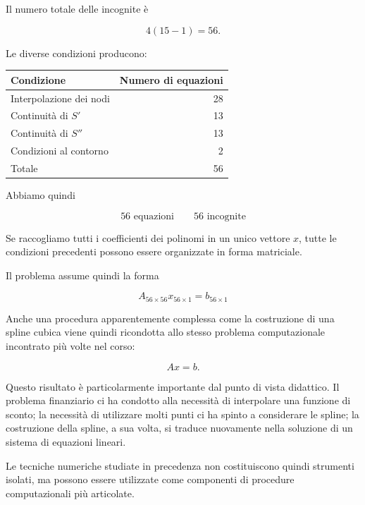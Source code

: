 Il numero totale delle incognite è

\begin{equation*}
    4(15-1)=56.
\end{equation*}

Le diverse condizioni producono:

\begin{center}
\begin{tabular}{lr}
\hline
Condizione & Numero di equazioni\\
\hline
Interpolazione dei nodi & 28\\
Continuità di $S'$ & 13\\
Continuità di $S''$ & 13\\
Condizioni al contorno & 2\\
\hline
Totale & 56\\
\hline
\end{tabular}
\end{center}

Abbiamo quindi

\begin{equation*}
    56\text{ equazioni}
    \qquad
    56\text{ incognite}
\end{equation*}

Se raccogliamo tutti i coefficienti dei polinomi in un unico vettore
$x$, tutte le condizioni precedenti possono essere organizzate in
forma matriciale.

Il problema assume quindi la forma

\begin{equation*}
    A_{56\times56}x_{56\times1}
    =
    b_{56\times1}
\end{equation*}

Anche una procedura apparentemente complessa come la costruzione di
una spline cubica viene quindi ricondotta allo stesso problema
computazionale incontrato più volte nel corso:

\begin{equation*}
    Ax=b.
\end{equation*}

Questo risultato è particolarmente importante dal punto di vista
didattico. Il problema finanziario ci ha condotto alla necessità di
interpolare una funzione di sconto; la necessità di utilizzare molti
punti ci ha spinto a considerare le spline; la costruzione della
spline, a sua volta, si traduce nuovamente nella soluzione di un
sistema di equazioni lineari.

Le tecniche numeriche studiate in precedenza non costituiscono quindi
strumenti isolati, ma possono essere utilizzate come componenti di
procedure computazionali più articolate.


